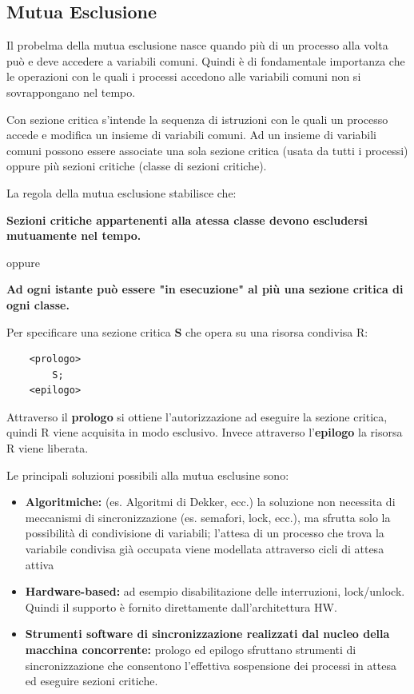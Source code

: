 \documentclass{article}
\begin{document}
\subsection{Mutua Esclusione}

Il probelma della mutua esclusione nasce quando più di un processo alla volta può e deve accedere a variabili comuni. Quindi è di fondamentale importanza che le operazioni con le quali
i processi accedono alle variabili comuni non si sovrappongano nel tempo.

\vspace{3mm}
Con sezione critica s'intende la sequenza di istruzioni con le quali un processo accede e modifica un insieme di variabili comuni. Ad un insieme di variabili comuni possono
essere associate una sola sezione critica (usata da tutti i processi) oppure più sezioni critiche (classe di sezioni critiche).

La regola della mutua esclusione stabilisce che:
\begin{center}
    \textbf{Sezioni critiche appartenenti alla atessa classe devono escludersi mutuamente nel tempo.}
    \vspace{3mm}

    oppure

    \vspace{3mm}
    \textbf{Ad ogni istante può essere "in esecuzione" al più una sezione critica di ogni classe.}
\end{center}

\vspace{3mm}
Per specificare una sezione critica \textbf{S} che opera su una risorsa condivisa R:

\begin{lstlisting}
    <prologo>
        S;
    <epilogo>
\end{lstlisting}

Attraverso il \textbf{prologo} si ottiene l'autorizzazione ad eseguire la sezione critica, quindi R viene acquisita in modo esclusivo. Invece attraverso l'\textbf{epilogo}
la risorsa R viene liberata.

\vspace{5mm}
Le principali soluzioni possibili alla mutua esclusine sono:
\begin{itemize}
    \item \textbf{Algoritmiche:} (es. Algoritmi di Dekker, ecc.) la soluzione non necessita di meccanismi di sincronizzazione (es. semafori, lock, ecc.), ma sfrutta
    solo la possibilità di condivisione di variabili; l'attesa di un processo che trova la variabile condivisa già occupata viene modellata attraverso cicli di attesa attiva
    \item \textbf{Hardware-based:} ad esempio disabilitazione delle interruzioni, lock/unlock. Quindi il supporto è fornito direttamente dall'architettura HW.
    \item \textbf{Strumenti software di sincronizzazione realizzati dal nucleo della macchina concorrente:} prologo ed epilogo sfruttano strumenti di sincronizzazione
    che consentono l'effettiva sospensione dei processi in attesa ed eseguire sezioni critiche.
\end{itemize}
\end{document}
